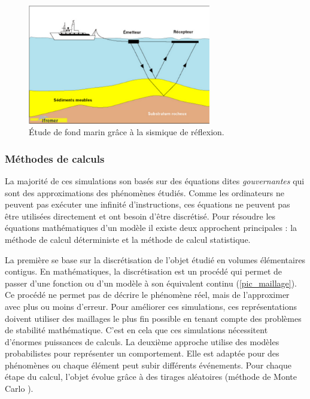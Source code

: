         \begin{figure}
            \center
            \includegraphics[width=8cm]{images/hpl_petrole.png}
            \caption{\label{pic:hpl_petrole}Étude de fond marin grâce à la sismique de réflexion.}
        \end{figure}



    \subsubsection{Méthodes de calculs}
    
        La majorité de ces simulations son basés sur des équations dites \textit{gouvernantes} qui sont des approximations des phénomènes étudiés. Comme les ordinateurs ne peuvent pas exécuter une infinité d'instructions, ces équations ne peuvent pas être utilisées directement et ont besoin d'être discrétisé. Pour résoudre les équations mathématiques d'un modèle il existe deux approchent principales : la méthode de calcul déterministe et la méthode de calcul statistique. 
        
        La première se base sur la discrétisation de l'objet étudié en volumes élémentaires contigus. En mathématiques, la discrétisation est un procédé qui permet de passer d'une fonction ou d'un modèle à son équivalent continu (\autoref{pic_maillage}). Ce procédé ne permet pas de décrire le phénomène réel, mais de l'approximer avec plus ou moins d'erreur. Pour améliorer ces simulations, ces représentations doivent utiliser des maillages le plus fin possible en tenant compte des problèmes de stabilité mathématique. C'est en cela que ces simulations nécessitent d'énormes puissances de calculs.
        La deuxième approche utilise des modèles probabilistes pour représenter un comportement. Elle est adaptée pour des phénomènes ou chaque élément peut subir différents événements. Pour chaque étape du calcul, l'objet évolue grâce à des tirages aléatoires (méthode de Monte Carlo \cite{Kroese2014}). 
        
